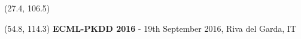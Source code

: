 \documentclass[final]{beamer}
\begin{document}
\begin{frame}{}
  \begin{textblock}{25.2}(27.4, 106.5)
    \small
  \end{textblock}
  

  \begin{textblock}{80}(54.8, 114.3)
    \footnotesize
    \textbf{ECML-PKDD 2016}  -  19th September 2016, Riva del Garda, IT\hfill
  \end{textblock}
  
\end{frame}
\end{document}
